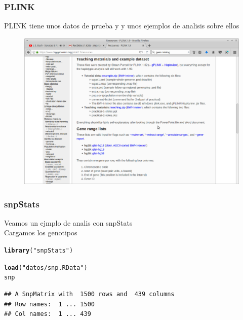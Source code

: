 \documentclass{beamer}\usepackage[]{graphicx}\usepackage[]{color}
\makeatletter
\newcommand{\hlstr}[1]{\textcolor[rgb]{0.192,0.494,0.8}{#1}}%
\newcommand{\hlstd}[1]{\textcolor[rgb]{0.345,0.345,0.345}{#1}}%
\newcommand{\hlkwd}[1]{\textcolor[rgb]{0.737,0.353,0.396}{\textbf{#1}}}%
\newenvironment{kframe}{%
 \def\at@end@of@kframe{}%
 \ifinner\ifhmode%
  \def\at@end@of@kframe{\end{minipage}}%
  \begin{minipage}{\columnwidth}%
 \fi\fi%
 \def\FrameCommand##1{\hskip\@totalleftmargin \hskip-\fboxsep
 \colorbox{shadecolor}{##1}\hskip-\fboxsep
     \hskip-\linewidth \hskip-\@totalleftmargin \hskip\columnwidth}%
 \MakeFramed {\advance\hsize-\width
   \@totalleftmargin\z@ \linewidth\hsize
   \@setminipage}}%
 {\par\unskip\endMakeFramed%
 \at@end@of@kframe}
\newenvironment{knitrout}{}{} %
\makeatother
\begin{document}
\begin{frame}[fragile]
\frametitle{PLINK}
PLINK tiene unos datos de prueba y y unos ejemplos de analisis sobre ellos

\begin{figure}
\begin{center}
\includegraphics[width=.8\linewidth]{plink.png}
\end{center}
\end{figure}


\end{frame}



\begin{frame}[fragile]
\frametitle{snpStats}
Veamos un ejmplo de analis con snpStats \\
Cargamos los genotipos
\begin{knitrout}\footnotesize
{}\color{fgcolor}\begin{kframe}
\begin{alltt}
\hlkwd{library}\hlstd{(}\hlstr{"snpStats"}\hlstd{)}
\end{alltt}


{\ttfamily\noindent\itshape\color{messagecolor}{\#\# Loading required package: survival}}

{\ttfamily\noindent\itshape\color{messagecolor}{\#\# Loading required package: Matrix}}\begin{alltt}
\hlkwd{load}\hlstd{(}\hlstr{"datos/snp.RData"}\hlstd{)}
\hlstd{snp}
\end{alltt}
\begin{verbatim}
## A SnpMatrix with  1500 rows and  439 columns
## Row names:  1 ... 1500 
## Col names:  1 ... 439
\end{verbatim}
\end{kframe}
\end{knitrout}
\end{frame}
\end{document}
